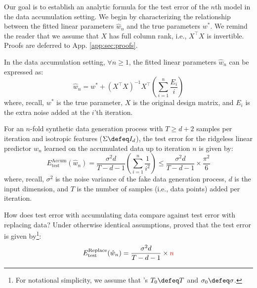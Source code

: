 Our goal is to establish an analytic formula for the test error of the $n$th model in the data accumulation setting. We begin by characterizing the relationship between the fitted linear parameters $\hat{w}_n$ and the true parameters $w^*$. We remind the reader that we assume that $X$ has full column rank, i.e., $X^\top X$ is invertible. Proofs are deferred to App. \ref{app:sec:proofs}.

\begin{theorem}
In the data accumulation setting, $\forall n \geq 1$, the fitted linear parameters $\hat{w}_n$ can be expressed as:
\begin{equation}
\hat{w}_n = w^* + (X^\top X)^{-1} X^\top \left(\sum_{i=1}^n \frac{E_i}{i}\right)
\end{equation}
where, recall, $w^*$ is the true parameter, $X$ is the original design matrix, and $E_i$ is the extra noise added at the $i$'th iteration.
\label{theorem:ridgeless_fitted_linear_parameters}
\end{theorem}

\begin{theorem}
For an $n$-fold synthetic data generation process with $T \geq d + 2$ samples per iteration and isotropic features ($\Sigma \defeq I_d$), the test error for the ridgeless linear predictor $\hat{w}_n$ learned on the accumulated data up to iteration $n$ is given by:
\begin{equation}
E_{\text{test}}^{\text{Accum}}(\hat{w}_n) = \frac{\sigma^2 d}{T-d-1} \left(\sum_{i=1}^n \frac{1}{i^2} \right) \leq \frac{\sigma^2 d}{T-d-1} \times \frac{\pi^2}{6}
\end{equation}
where, recall, $\sigma^2$ is the noise variance of the fake data generation process, $d$ is the input dimension, and $T$ is the number of samples (i.e., data points) added per iteration.
\label{thm:warmup_ridgeless_isotropic}
\end{theorem}

How does test error with accumulating data compare against test error with replacing data? Under otherwise identical assumptions, \citet{dohmatob2024model} proved  that the test error is given by\footnote{For notational simplicity, we assume that \citet{dohmatob2024model}'s $T_0 \defeq T$ and $\sigma_0 \defeq \sigma$.}:
\begin{equation}
E_{\text{test}}^{\text{Replace}}(\hat{w}_n) = \frac{\sigma^2 d}{T - d -1} \times \color{red}n \color{black}
\label{dohmatob2024thm4p1}
\end{equation}

